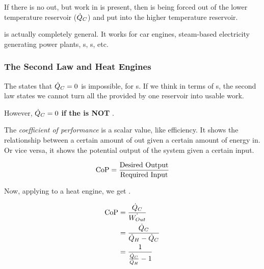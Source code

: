 If there is no  out, but work in is present, then  is being forced out of the lower temperature reservoir ($\dot{Q}_{C}$) and put into the higher temperature reservoir.

 is actually completely general.
It works for car engines, steam-based electricity generating power plants, s, s, etc.

\subsubsection{The Second Law and Heat Engines}\label{subsubsec:2nd_Law_Heat_Engines}
The  states that $\dot{Q}_{C} = 0$ is impossible, for s.
If we think in terms of s, the second law states we cannot turn all the  provided by one reservoir into usable work.

However, $\dot{Q}_{C} = 0$ \textbf{if the  is NOT }.

\begin{definition}\label{def:Coefficient_of_Performance}
  The \emph{coefficient of performance} is a scalar value, like efficiency.
  It shows the relationship between a certain amount of  out given a certain amount of energy in.
  Or vice versa, it shows the potential output of the system given a certain input.

  \begin{equation}\label{eq:Coefficient_of_Performance}
    \text{CoP} = \frac{\text{Desired Output}}{\text{Required Input}}
  \end{equation}
\end{definition}

Now, applying  to a heat engine, we get .

\begin{equation}\label{eq:Coefficient_of_Performance-Heat_Engine}
  \begin{aligned}
    \text{CoP} &= \frac{\dot{Q}_{C}}{\dot{W_{Out}}} \\
    &= \frac{\dot{Q}_{C}}{\dot{Q}_{H} - \dot{Q}_{C}} \\
    &= \frac{1}{\frac{\dot{Q}_{C}}{\dot{Q}_{H}} - 1}
  \end{aligned}
\end{equation}

